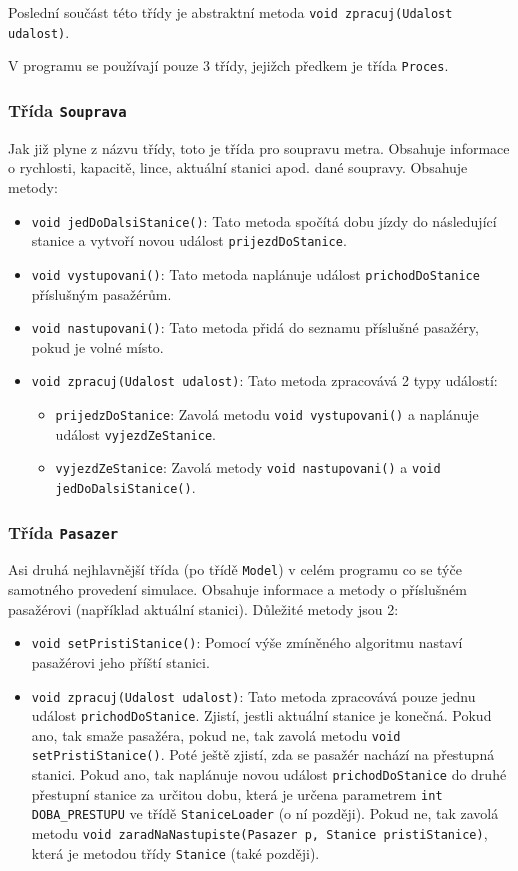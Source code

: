\documentclass[12pt, a4paper]{article}
\begin{document}
Poslední součást této třídy je abstraktní metoda \texttt{void zpracuj(Udalost udalost)}.

V programu se používají pouze 3 třídy, jejižch předkem je třída \texttt{Proces}.

\subsubsection{Třída \texttt{Souprava}}
Jak již plyne z názvu třídy, toto je třída pro soupravu metra. Obsahuje informace o rychlosti, kapacitě, lince, aktuální stanici apod. dané soupravy. Obsahuje metody:
\begin{itemize}
    \item \texttt{void jedDoDalsiStanice()}: Tato metoda spočítá dobu jízdy do následující stanice a vytvoří novou událost \texttt{prijezdDoStanice}.
    \item \texttt{void vystupovani()}: Tato metoda naplánuje událost \texttt{prichodDoStanice} příslušným pasažérům.
    \item \texttt{void nastupovani()}: Tato metoda přidá do seznamu příslušné pasažéry, pokud je volné místo.
    \item \texttt{void zpracuj(Udalost udalost)}: Tato metoda zpracovává 2 typy událostí:
    \begin{itemize}
        \item \texttt{prijedzDoStanice}: Zavolá metodu \texttt{void vystupovani()} a naplánuje událost \texttt{vyjezdZeStanice}.
        \item \texttt{vyjezdZeStanice}: Zavolá metody \texttt{void nastupovani()} a \texttt{void jedDoDalsiStanice()}.
    \end{itemize}
\end{itemize}

\subsubsection{Třída \texttt{Pasazer}}
Asi druhá nejhlavnější třída (po třídě \texttt{Model}) v celém programu co se týče samotného provedení simulace. Obsahuje informace a metody o příslušném pasažérovi (například aktuální stanici). Důležité metody jsou 2:
\begin{itemize}
    \item \texttt{void setPristiStanice()}: Pomocí výše zmíněného algoritmu nastaví pasažérovi jeho příští stanici.
    \item \texttt{void zpracuj(Udalost udalost)}: Tato metoda zpracovává pouze jednu událost \texttt{prichodDoStanice}. Zjistí, jestli aktuální stanice je konečná. Pokud ano, tak smaže pasažéra, pokud ne, tak zavolá metodu \texttt{void setPristiStanice()}. Poté ještě zjistí, zda se pasažér nachází na přestupná stanici. Pokud ano, tak naplánuje novou událost \texttt{prichodDoStanice} do druhé přestupní stanice za určitou dobu, která je určena parametrem \texttt{int DOBA\_PRESTUPU} ve třídě \texttt{StaniceLoader} (o ní později). Pokud ne, tak zavolá metodu \texttt{void zaradNaNastupiste(Pasazer p, Stanice pristiStanice)}, která je metodou třídy \texttt{Stanice} (také později).
\end{itemize}
\end{document}
